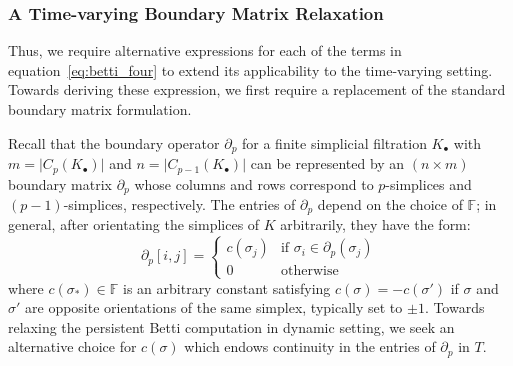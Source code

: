 \documentclass[10pt]{article}
\newcommand{\+}{%
	\raisebox{0.18ex}{\scaleobj{0.55}{+}}
}
\begin{document}


\subsubsection*{A Time-varying Boundary Matrix Relaxation}
Thus, we require alternative expressions for each of the terms in equation~\eqref{eq:betti_four} to extend its applicability to the time-varying setting. Towards deriving these expression, we first require a replacement of the standard boundary matrix formulation. 



Recall that the boundary operator $\partial_p$ for a finite simplicial filtration $K_{\bullet}$ with $m = \lvert C_p(K_{\bullet}) \rvert$ and $n = \lvert C_{p-1}(K_{\bullet}) \rvert$ can be represented by an $(n \times m)$ boundary matrix $\partial_p$ whose columns and rows correspond to $p$-simplices and $(p-1)$-simplices, respectively. The entries of $\partial_p$ depend on the choice of $\mathbb{F}$; in general, after orientating the simplices of $K$ arbitrarily, they have the form: 
\begin{equation}\label{eq:matrix_pchain}
	\partial_p[i, j] = \begin{cases} 
	c(\sigma_j)  & \text{if } \sigma_i \in \partial_p(\sigma_j) \\
	0 & \text{otherwise}
   \end{cases}
\end{equation}
where $c(\sigma_\ast) \in \mathbb{F}$ is an arbitrary constant satisfying $c(\sigma) = -c(\sigma')$ if $\sigma$ and $\sigma'$ are opposite orientations of the same simplex, typically set to $\pm 1$.  Towards relaxing the persistent Betti computation in dynamic setting, we seek an alternative choice for $c(\sigma)$ which endows continuity in the entries of $\partial_p$ in $T$.
\end{document}
